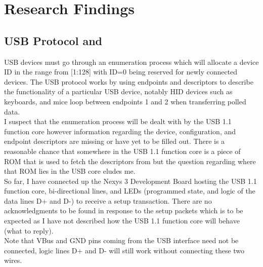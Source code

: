 \documentclass[10pt,a4paper]{article}
\begin{document}
\section{Research Findings}
\subsection{USB Protocol and }
USB devices must go through an enumeration process which will allocate a device ID in the range from [1:128] with ID=0 being reserved for newly connected devices. The USB protocol works by using endpoints and descriptors to describe the functionality of a particular USB device, notably HID devices such as keyboards, and mice loop between endpoints 1 and 2 when transferring polled data.\\

I suspect that the enumeration process will be dealt with by the USB 1.1 function core however information regarding the device, configuration, and endpoint descriptors are missing or have yet to be filled out. There is a reasonable chance that somewhere in the USB 1.1 function core is a piece of ROM that is used to fetch the descriptors from but the question regarding where that ROM lies in the USB core eludes me.\\

So far, I have connected up the Nexys 3 Development Board hosting the USB 1.1 function core, bi-directional lines, and LEDs (programmed state, and logic of the data lines D+ and D-) to receive a setup transaction. There are no acknowledgments to be found in response to the setup packets which is to be expected as I have not described how the USB 1.1 function core will behave (what to reply).\\

Note that VBus and GND pins coming from the USB interface need not be connected, logic lines D+ and D- will still work without connecting these two wires.
\end{document}
